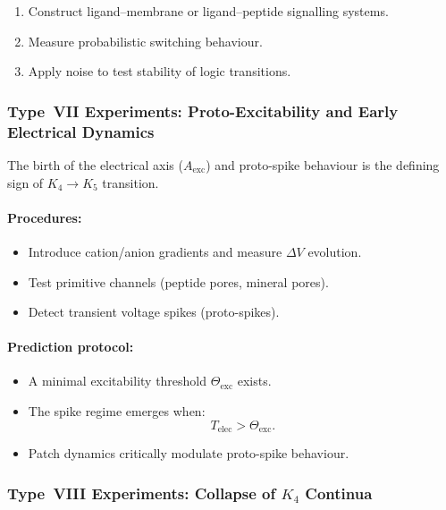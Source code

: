 \begin{enumerate}
    \item Construct ligand–membrane or ligand–peptide signalling systems.
    \item Measure probabilistic switching behaviour.
    \item Apply noise to test stability of logic transitions.
\end{enumerate}



\subsubsection{Type~VII Experiments: Proto-Excitability and Early Electrical Dynamics}

The birth of the electrical axis ($A_{\mathrm{exc}}$) and proto-spike
behaviour is the defining sign of $K_4 \rightarrow K_5$ transition.

\paragraph{Procedures:}

\begin{itemize}
    \item Introduce cation/anion gradients and measure $\Delta V$ evolution.
    \item Test primitive channels (peptide pores, mineral pores).
    \item Detect transient voltage spikes (proto-spikes).
\end{itemize}

\paragraph{Prediction protocol:}

\begin{itemize}
    \item A minimal excitability threshold $\Theta_{\mathrm{exc}}$ exists.
    \item The spike regime emerges when:
          \[
              T_{\mathrm{elec}} > \Theta_{\mathrm{exc}}.
          \]
    \item Patch dynamics critically modulate proto-spike behaviour.
\end{itemize}



\subsubsection{Type~VIII Experiments: Collapse of \texorpdfstring{$K_4$}{K_4} Continua}

